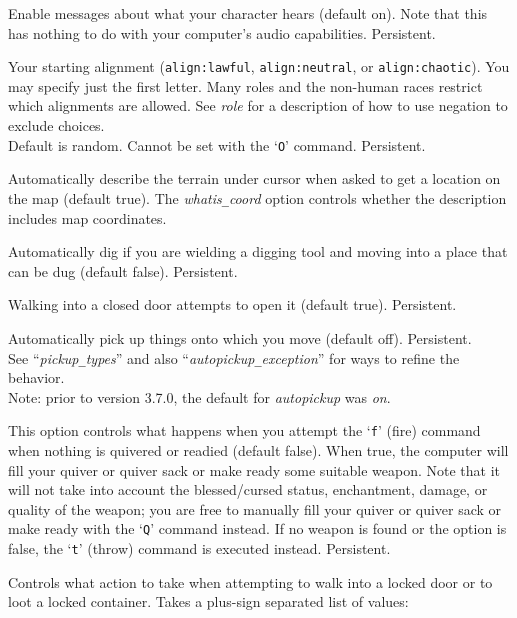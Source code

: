 \blist{}
\item[\ib{acoustics}]
Enable messages about what your character hears (default on).
Note that this has nothing to do with your computer's audio capabilities.
Persistent.
\item[\ib{alignment}]
Your starting alignment ({\tt align:lawful}, {\tt align:neutral},
or {\tt align:chaotic}).
You may specify just the first letter.
Many roles and the non-human races restrict which alignments are allowed.
See {\it role\/}
for a description of how to use negation to exclude choices.
\\
Default is random.
Cannot be set with the `{\tt O}' command.  Persistent.
\item[\ib{autodescribe}]
Automatically describe the terrain under cursor when asked to get a location
on the map (default true).
The {\it whatis\verb+_+coord\/}
option controls whether the description includes map coordinates.
\item[\ib{autodig}]
Automatically dig if you are wielding a digging tool and moving into a place
that can be dug (default false).  Persistent.
\item[\ib{autoopen}]
Walking into a closed door attempts to open it (default true).
Persistent.
\item[\ib{autopickup}]
Automatically pick up things onto which you move (default off).
Persistent.
\\
See ``{\it pickup\verb+_+types\/}'' and also
``{\it autopickup\verb+_+exception\/}'' for ways to refine the behavior.
\\
Note: prior to version 3.7.0, the default for {\it autopickup\/} was {\it on}.
\item[\ib{autoquiver}]
This option controls what happens when you attempt the `{\tt f}' (fire)
command when nothing is quivered or readied (default false).
When true, the computer will fill
your quiver or quiver sack or make ready some suitable weapon.
Note that it will not take
into account the blessed/cursed status, enchantment, damage, or
quality of the weapon; you are free to manually fill your quiver
or quiver sack or make ready
with the `{\tt Q}' command instead.
If no weapon is found or the option is
false, the `{\tt t}' (throw) command is executed instead.  Persistent.
\item[\ib{autounlock}]
Controls what action to take when attempting to walk into a locked door
or to loot a locked container.
Takes a plus-sign separated list of values:
